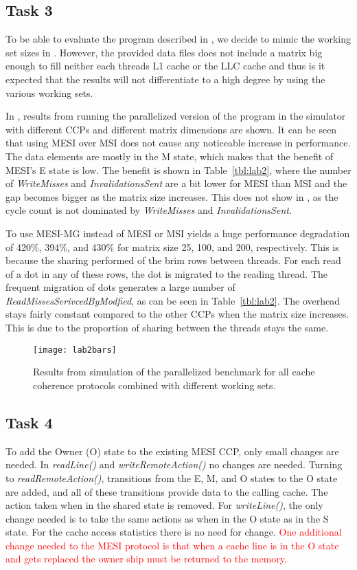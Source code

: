 \subsection{Task 3}
To be able to evaluate the program described in , we decide to mimic the working set sizes in . However, the provided data files does not include a matrix big enough to fill neither each threads L1 cache or the LLC cache and thus is it expected that the results will not differentiate to a high degree by using the various working sets. 

In , results from running the parallelized version of the program in the simulator with different CCPs and different matrix dimensions are shown. It can be seen that using MESI over MSI does not cause any noticeable increase in performance. The data elements are mostly in the M state, which makes that the benefit of MESI's E state is low. The benefit is shown in Table~\ref{tbl:lab2}, where the number of \textit{WriteMisses} and \textit{InvalidationsSent} are a bit lower for MESI than MSI and the gap becomes bigger as the matrix size increases. This does not show in , as the cycle count is not dominated by \textit{WriteMisses} and \textit{InvalidationsSent}.

To use MESI-MG instead of MESI or MSI yields a huge performance degradation of 420\%, 394\%, and 430\% for matrix size 25, 100, and 200, respectively. This is because the sharing performed of the brim rows between threads. For each read of a dot in any of these rows, the dot is migrated to the reading thread. The frequent migration of dots generates a large number of \textit{ReadMissesSerivcedByModfied}, as can be seen in Table~\ref{tbl:lab2}. The overhead stays fairly constant compared to the other CCPs when the matrix size increases. This is due to the proportion of sharing between the threads stays the same.  

\begin{figure}[t]
	\center
	\texttt{[image: lab2bars]}
	\caption{Results from simulation of the parallelized benchmark for all cache coherence protocols combined with different working sets.}
	\label{fig:lab2}
\end{figure}

\subsection{Task 4}
To add the Owner (O) state to the existing MESI CCP, only small changes are needed. In \textit{readLine()} and \textit{writeRemoteAction()} no changes are needed. Turning to \textit{readRemoteAction()}, transitions from the E, M, and O states to the O state are added, and all of these transitions provide data to the calling cache. The action taken when in the shared state is removed. For \textit{writeLine()}, the only change needed is to take the same actions as when in the O state as in the S state. For the cache access statistics there is no need for change. \textcolor{red}{One additional change needed to the MESI protocol is that when a cache line is in the O state and gets replaced the owner ship must be returned to the memory.}
 
